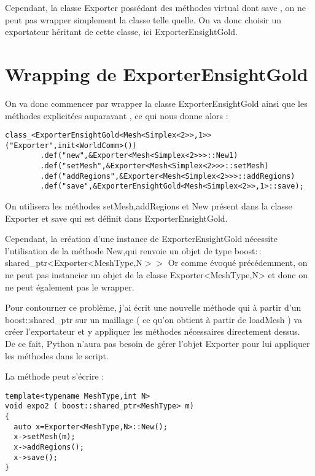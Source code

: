 \documentclass[12pt]{article}
\begin{document}
Cependant, la classe Exporter possédant des méthodes virtual dont save , on ne peut pas wrapper simplement la classe telle quelle. On va donc choisir un exportateur héritant de cette classe, ici ExporterEnsightGold.

\section{Wrapping de ExporterEnsightGold}

On va donc commencer par wrapper la classe ExporterEnsightGold  ainsi que les méthodes explicitées auparavant , ce qui nous donne alors :

\begin{lstlisting}
class_<ExporterEnsightGold<Mesh<Simplex<2>>,1>>("Exporter",init<WorldComm>())
        .def("new",&Exporter<Mesh<Simplex<2>>>::New1)
        .def("setMesh",&Exporter<Mesh<Simplex<2>>>::setMesh) 
        .def("addRegions",&Exporter<Mesh<Simplex<2>>>::addRegions)
        .def("save",&ExporterEnsightGold<Mesh<Simplex<2>>,1>::save);
\end{lstlisting}
\vspace{0.5 cm}
On utilisera les méthodes setMesh,addRegions et New présent dans la classe Exporter et save qui est définit dans ExporterEnsightGold.
\vspace{0.5 cm}

Cependant, la création d'une instance de ExporterEnsightGold nécessite l'utilisation de la méthode New,qui renvoie un objet de type boost$::$shared\_ptr<Exporter<MeshType,N$>>$
Or comme évoqué précédemment, on ne peut pas instancier un objet de la classe Exporter<MeshType,N> et donc on ne peut également pas le wrapper.
\vspace{0.5 cm}

Pour contourner ce problème, j'ai écrit une nouvelle méthode qui à partir d'un boost::shared\_ptr sur un maillage ( ce qu'on obtient à partir de loadMesh ) va créer l'exportateur et y appliquer les méthodes nécessaires directement dessus.\\
De ce fait, Python n'aura pas besoin de gérer l'objet Exporter pour lui appliquer les méthodes dans le script.

La méthode peut s'écrire : 

\begin{lstlisting}
template<typename MeshType,int N>
void expo2 ( boost::shared_ptr<MeshType> m)
{
  auto x=Exporter<MeshType,N>::New();
  x->setMesh(m);
  x->addRegions();
  x->save();
}
\end{lstlisting}
\end{document}

